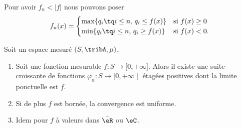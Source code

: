 \begin{remark}
    Pour avoir \(  f_n <| f |\) nous pouvons poser
    \begin{equation}
        f_n(x)=\begin{cases}
            \max\{ q_i\tq i\leq n,\, q_i\leq f(x) \}    &   \text{si } f(x)\geq 0         \\
            \min\{ q_i\tq i\leq n,\, q_i\geq f(x) \}    &   \text{si } f(x)< 0\text{.}
        \end{cases}
    \end{equation}
\end{remark}

\begin{theorem}\label{THOooXHIVooKUddLi}
    Soit un espace mesuré \( (S,\tribA,\mu)\).
    \begin{enumerate}
        \item
        Soit une fonction mesurable \( f\colon S\to \mathopen[ 0 , +\infty \mathclose]\). Alors il existe une suite croissante de fonctions \( \varphi_n\colon S\to \mathopen[ 0 , +\infty \mathclose[\) étagées positives dont la limite ponctuelle est \( f\).
        \item
            Si de plus \( f\) est bornée, la convergence est uniforme.
        \item
            Idem pour \( f\) à valeurs dans \( \bar \eR\) ou \( \eC\).
    \end{enumerate}
\end{theorem}

